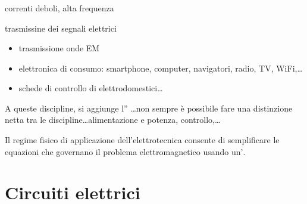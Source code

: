 \documentclass[letterpaper,10pt,italian]{jupyterBook}
\begin{document}
\subsubsection*{}

\sphinxAtStartPar
{} correnti deboli, alta frequenza

\sphinxAtStartPar
{} trasmissine dei segnali elettrici
\begin{itemize}
\item {} 
\sphinxAtStartPar
trasmissione onde EM

\item {} 
\sphinxAtStartPar
elettronica di consumo: smartphone, computer, navigatori, radio, TV, Wi\sphinxhyphen{}Fi,…

\item {} 
\sphinxAtStartPar
schede di controllo di elettrodomestici…

\end{itemize}

\sphinxAtStartPar
A queste discipline, si aggiunge l” …non sempre è possibile fare una distinzione netta tra le discipline…alimentazione e potenza, controllo,…

\sphinxAtStartPar
Il regime fisico di applicazione dell’elettrotecnica consente di semplificare le equazioni che governano il problema elettromagnetico usando un\(\text{'}\).

\sphinxstepscope


\section{Circuiti elettrici}
\label{\detokenize{ch/electromagnetism/circuits-electric:circuiti-elettrici}}\label{\detokenize{ch/electromagnetism/circuits-electric:physics-hs-electromagnetism-circuits-electric}}\label{\detokenize{ch/electromagnetism/circuits-electric::doc}}
\end{document}
